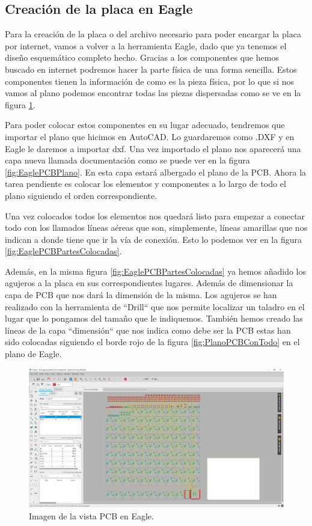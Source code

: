 \subsection{Creación de la placa en Eagle}

Para la creación de la placa o del archivo necesario para poder encargar la placa por internet, vamos a volver a la herramienta Eagle, dado que ya tenemos el diseño esquemático completo hecho. Gracias a los componentes que hemos buscado en internet podremos hacer la parte física de una forma sencilla. Estos componentes tienen la información de como es la pieza física, por lo que si nos vamos al plano podemos encontrar todas las piezas dispersadas como se ve en la figura \ref{fig:EaglePCBNueva}.

Para poder colocar estos componentes en su lugar adecuado, tendremos que importar el plano que hicimos en AutoCAD. Lo guardaremos como .DXF y en Eagle le daremos a importar dxf. Una vez importado el plano nos aparecerá una capa nueva llamada documentación como se puede ver en la figura \ref{fig:EaglePCBPlano}. En esta capa estará albergado el plano de la \gls{PCB}. Ahora la tarea pendiente es colocar los elementos y componentes a lo largo de todo el plano siguiendo el orden correspondiente.

Una vez colocados todos los elementos nos quedará listo para empezar a conectar todo con los llamados líneas aéreas que son, simplemente, líneas amarillas que nos indican a donde tiene que ir la vía de conexión. Esto lo podemos ver en la figura \ref{fig:EaglePCBPartesColocadas}. 

Además, en la misma figura \ref{fig:EaglePCBPartesColocadas} ya hemos añadido los agujeros a la placa en sus correspondientes lugares. Además de dimensionar la capa de \gls{PCB} que nos dará la dimensión de la misma. Los agujeros se han realizado con la herramienta de ``Drill`` que nos permite localizar un taladro en el lugar que lo pongamos del tamaño que le indiquemos. También hemos creado las líneas de la capa ``dimensión`` que nos indica como debe ser la \gls{PCB} estas han sido colocadas siguiendo el borde rojo de la figura \ref{fig:PlanoPCBConTodo} en el plano de Eagle.
\newpage

\begin{figure}[H]
    \centering
    \includegraphics[width=1\textwidth]{imagenes/Capitulos/Cap05/EaglePCBNueva.png}
    \caption{Imagen de la vista \gls{PCB} en Eagle.}
    \label{fig:EaglePCBNueva}
\end{figure}

